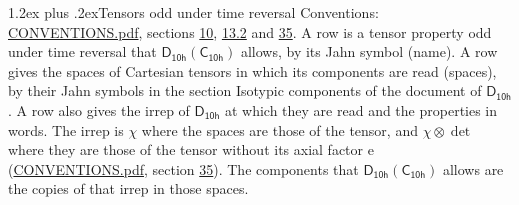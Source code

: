 \documentclass[10pt,a4paper]{article}
\makeatletter
\renewcommand\section{\@startsection{section}{1}{\z@}{-3ex plus -1ex minus -.2ex}%
  {1.2ex plus .2ex}{\normalfont\large\sffamily\bfseries\color{parttitle}}}
\numberwithin{equation}{section}
\newcommand{\grp}[1]{\mathsf{#1}}
\newcommand{\irrprod}{\otimes}
\makeatother
\begin{document}
\section{Tensors odd under time reversal}\label{s:time_odd}
Conventions: \href{../../CONVENTIONS.pdf}{CONVENTIONS.pdf}, sections \href{../../../rotation/CONVENTIONS.pdf\#conv.10}{10}, \href{../../../rotation/CONVENTIONS.pdf\#conv.13.2}{13.2} and \href{../../CONVENTIONS.pdf\#conv.35}{35}.
\leavevmode\label{n:head.name.property}A row is a tensor property odd under time reversal that $\grp{D_{10h}}(\grp{C_{10h}})$ allows, by its Jahn symbol (name). \label{n:head.spaces}A row gives the spaces of Cartesian tensors in which its components are read (spaces), by their Jahn symbols in the section Isotypic components of the document of \href{../../../rotation/data/pdf/D10h.pdf}{$\grp{D_{10h}}$}. \label{n:head.properties}A row also gives the irrep of $\grp{D_{10h}}$ at which they are read and the properties in words. The irrep is $\chi$ where the spaces are those of the tensor, and $\chi \irrprod \det$ where they are those of the tensor without its axial factor e (\href{../../CONVENTIONS.pdf}{CONVENTIONS.pdf}, section \href{../../CONVENTIONS.pdf\#conv.35}{35}). The components that $\grp{D_{10h}}(\grp{C_{10h}})$ allows are the copies of that irrep in those spaces.
\end{document}
